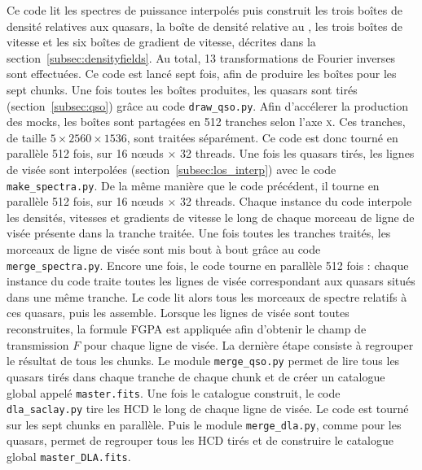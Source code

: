 Ce code lit les spectres de puissance interpolés puis construit les trois boîtes de densité relatives aux quasars, la boîte de densité relative au \lya{}, les trois boîtes de vitesse et les six boîtes de gradient de vitesse, décrites dans la section~\ref{subsec:densityfields}.
Au total, \num{13} transformations de Fourier inverses sont effectuées.
Ce code est lancé sept fois, afin de produire les boîtes pour les sept chunks.
Une fois toutes les boîtes produites, les quasars sont tirés (section~\ref{subsec:qso}) grâce au code \texttt{draw\_qso.py}. Afin d'accélerer la production des mocks, les boîtes sont partagées en \num{512} tranches selon l'axe \textsc{x}. Ces tranches, de taille $\num{5}\times\num{2560}\times\num{1536}$, sont traitées séparément. Ce code est donc tourné en parallèle \num{512} fois, sur 16 n{\oe}uds $\times$ 32 threads.
Une fois les quasars tirés, les lignes de visée sont interpolées (section~\ref{subsec:los_interp}) avec le code \texttt{make\_spectra.py}. De la même manière que le code précédent, il tourne en parallèle \num{512} fois, sur 16 n{\oe}uds $\times$ 32 threads.
Chaque instance du code interpole les densités, vitesses et gradients de vitesse le long de chaque morceau de ligne de visée présente dans la tranche traitée.
Une fois toutes les tranches traités, les morceaux de ligne de visée sont mis bout à bout grâce au code \texttt{merge\_spectra.py}.
Encore une fois, le code tourne en parallèle \num{512} fois : chaque instance du code traite toutes les lignes de visée correspondant aux quasars situés dans une même tranche. Le code lit alors tous les morceaux de spectre relatifs à ces quasars, puis les assemble.
Lorsque les lignes de visée sont toutes reconstruites, la formule FGPA est appliquée afin d'obtenir le champ de transmission $F$ pour chaque ligne de visée.
La dernière étape consiste à regrouper le résultat de tous les chunks. Le module \texttt{merge\_qso.py} permet de lire tous les quasars tirés dans chaque tranche de chaque chunk et de créer un catalogue global appelé \texttt{master.fits}. Une fois le catalogue construit, le code \texttt{dla\_saclay.py} tire les HCD le long de chaque ligne de visée. Le code est tourné sur les sept chunks en parallèle. Puis le module \texttt{merge\_dla.py}, comme pour les quasars, permet de regrouper tous les HCD tirés et de construire le catalogue global \texttt{master\_DLA.fits}.
